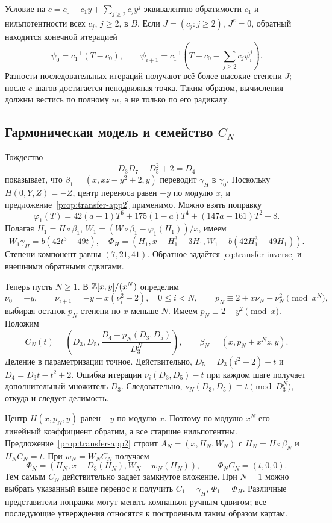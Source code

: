 Условие на $c=c_0+c_1y+\sum_{j\ge2}c_jy^j$ эквивалентно обратимости
$c_1$ и нильпотентности всех $c_j$, $j\ge2$, в $B$.
Если $J=(c_j:j\ge2)$, $J^e=0$, обратный находится конечной итерацией
\[
 \psi_0=c_1^{-1}(T-c_0),\qquad
 \psi_{i+1}=c_1^{-1}\left(T-c_0-\sum_{j\ge2}c_j\psi_i^j\right).
\]
Разности последовательных итераций получают всё более высокие степени
$J$; после $e$ шагов достигается неподвижная точка. Таким образом,
вычисления должны вестись по полному $m$, а не только по его радикалу.

\subsection{Гармоническая модель и семейство $C_N$}\label{subsec:family-app2}
Тождество
\[
 D_3D_7-D_5^2+2=D_4
\]
показывает, что $\beta_1=(x,xz-y^2+2,y)$ переводит $\gamma_H$ в
$\gamma_0$. Поскольку $H(0,Y,Z)=-Z$, центр переноса равен $-y$
по модулю $x$, и предложение~\ref{prop:transfer-app2} применимо.
Можно взять поправку
\[
 \varphi_1(T)=42(a-1)T^6+175(1-a)T^4+(147a-161)T^2+8.
\]
Полагая $H_1=H\circ\beta_1$,
$W_1=(W\circ\beta_1-\varphi_1(H_1))/x$, имеем
\[
 W_1\gamma_H=b(42t^3-49t),\quad
 \Phi_H=(H_1,x-H_1^3+3H_1,W_1-b(42H_1^3-49H_1)).
\]
Степени компонент равны $(7,21,41)$. Обратное задаётся
\eqref{eq:transfer-inverse} и внешними обратными сдвигами.

Теперь пусть $N\ge1$. В ${\mathbb Z}[x,y]/(x^N)$ определим
\[
 \nu_0=-y,\qquad \nu_{i+1}=-y+x(\nu_i^2-2),\quad 0\le i<N,
 \qquad p_N\equiv2+x\nu_N-\nu_N^2\pmod{x^N},
\]
выбирая остаток $p_N$ степени по $x$ меньше $N$. Имеем
$p_N\equiv2-y^2\pmod x$. Положим
\begin{equation}\label{eq:family-CN}
 C_N(t)=\left(D_3,D_5,
 \frac{D_4-p_N(D_3,D_5)}{D_3^N}\right),\qquad
 \beta_N=(x,p_N+x^Nz,y).
\end{equation}
Деление в параметризации точное. Действительно,
$D_5=D_3(t^2-2)-t$ и $D_4=D_3t-t^2+2$.
Ошибка итерации $\nu_i(D_3,D_5)-t$ при каждом шаге получает дополнительный
множитель $D_3$. Следовательно, $\nu_N(D_3,D_5)\equiv t\pmod{D_3^N}$,
откуда и следует делимость.

Центр $H(x,p_N,y)$ равен $-y$ по модулю $x$. Поэтому по модулю $x^N$
его линейный коэффициент обратим, а все старшие нильпотентны.
Предложение~\ref{prop:transfer-app2} строит $A_N=(x,H_N,W_N)$ с
$H_N=H\circ\beta_N$ и $H_NC_N=t$. При $w_N=W_NC_N$ получаем
\begin{equation}\label{eq:family-rectifier}
 \Phi_N=(H_N,x-D_3(H_N),W_N-w_N(H_N)),\qquad
 \Phi_NC_N=(t,0,0).
\end{equation}
Тем самым $C_N$ действительно задаёт замкнутое вложение.
При $N=1$ можно выбрать указанный выше перенос и получить
$C_1=\gamma_H$, $\Phi_1=\Phi_H$. Различные представители поправки
могут менять компаньон ручным сдвигом; все последующие утверждения
относятся к построенным таким образом картам.


